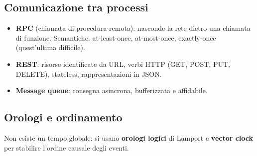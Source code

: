 \subsection{Comunicazione tra processi}
\begin{itemize}
    \item \textbf{RPC} (chiamata di procedura remota): nasconde la rete dietro una chiamata di funzione. Semantiche: at-least-once, at-most-once, exactly-once (quest'ultima difficile).
    \item \textbf{REST}: risorse identificate da URL, verbi HTTP (GET, POST, PUT, DELETE), stateless, rappresentazioni in JSON.
    \item \textbf{Message queue}: consegna asincrona, bufferizzata e affidabile.
\end{itemize}

\subsection{Orologi e ordinamento}
Non esiste un tempo globale: si usano \textbf{orologi logici} di Lamport e \textbf{vector clock} per stabilire l'ordine causale degli eventi.

